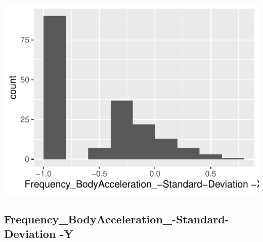 \documentclass[
]{article}
\begin{document}
\begin{minipage}{0.25 \textwidth}

\includegraphics{codebook_tidydatasub_files/figure-latex/Var-46-Frequency-BodyAcceleration--Standard-Deviation--X-1.pdf}

\end{minipage}

\noindent\makebox[\linewidth]{\rule{\textwidth}{0.4pt}}

\hypertarget{frequency_bodyacceleration_-standard-deviation--y}{%
\subsection{Frequency\_BodyAcceleration\_-Standard-Deviation
-Y}\label{frequency_bodyacceleration_-standard-deviation--y}}
\end{document}
